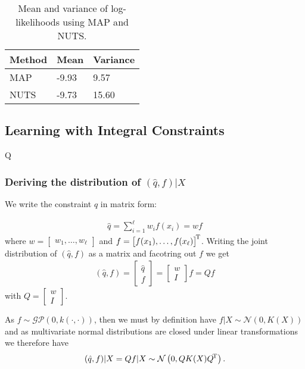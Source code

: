 \begin{table}[H]
  \centering
  \begin{tabular}{lll}
    \toprule
    Method & Mean  & Variance \\
    \midrule
    MAP    & -9.93 & 9.57     \\
    NUTS   & -9.73 & 15.60    \\
    \bottomrule
  \end{tabular}  
  \caption{
    Mean and variance of log-likelihoods using MAP and NUTS.
  }
  \label{tab:gp:map_nuts_ll_mean_var}
\end{table}

\subsection{Learning with Integral Constraints}Q

\subsubsection{Deriving the distribution of $(\hat{q}, f) | X$}

We write the constraint $\hat{q}$ in matrix form:

\begin{align*}
  \hat{q} = \sum_{i=1}^\ell w_i f(x_i) = {w} f
\end{align*}
where $w = \begin{bmatrix} w_1, \ldots, w_\ell \end{bmatrix}$
and $f = {\begin{bmatrix} f(x_1), \ldots, f(x_\ell) \end{bmatrix}}^{\!\text{T}}$.
%
Writing the joint distribution of $(\hat{q}, f)$ as a matrix
and facotring out $f$ we get
\begin{align*}
  (\hat{q}, f)
  = \left[ \begin{array}{c} \hat{q} \\ \hline f \end{array} \right]
  = \left[ \begin{array}{c} w \\ \hline I \end{array} \right] f
  = Q f
\end{align*}
with $Q = \left[ \begin{array}{c} w \\ \hline I \end{array} \right]$.

As $f \sim \mathcal{GP}(0, k(\cdot, \cdot))$, then we must by definition have
$f | X \sim \mathcal{N}\left( 0, K(X) \right)$
and as multivariate normal distributions are closed under linear transformations
we therefore have
\begin{align*}
  (\hat{q}, f) | X
  = Q f | X
  \sim \mathcal{N}\left( 0, Q K(X) {Q}^{\!\text{T}} \right).
\end{align*}

